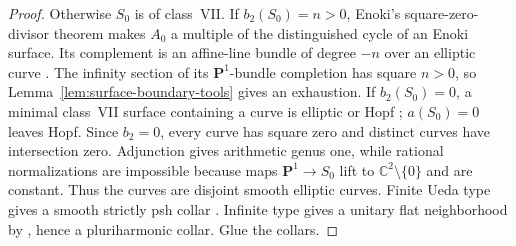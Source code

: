 \documentclass[11pt]{amsart}
\theoremstyle{definition}
\theoremstyle{remark}
\numberwithin{equation}{section}
\newcommand{\C}{\mathbb C}
\newcommand{\PP}{\mathbf P}
\begin{document}
\begin{proof}
Otherwise $S_0$ is of class~VII. If $b_2(S_0)=n>0$, Enoki's
square-zero-divisor theorem \cite[Main Theorem, p.~454]{Enoki}
makes $A_0$ a multiple of the distinguished cycle of an Enoki surface.
Its complement is an affine-line bundle of degree $-n$ over an
elliptic curve \cite[(0.4), p.~453]{Enoki}. The infinity section of
its $\PP^1$-bundle completion has square $n>0$, so
Lemma~\ref{lem:surface-boundary-tools} gives an exhaustion.
If $b_2(S_0)=0$, a minimal class~VII surface containing a curve is
elliptic or Hopf \cite[p.~453]{Enoki}; $a(S_0)=0$ leaves Hopf.
Since $b_2=0$, every curve has square zero and distinct curves have
intersection zero. Adjunction gives arithmetic genus one, while
rational normalizations are impossible because maps
$\PP^1\to S_0$ lift to $\C^2\setminus\{0\}$ and are constant.
Thus the curves are disjoint smooth elliptic curves.
Finite Ueda type gives a smooth strictly psh collar
\cite[Theorem~2.5]{CLPT2018}. Infinite type gives a unitary flat
neighborhood by \cite[Theorem~1.6]{CFSTZ2026}, hence a
pluriharmonic collar. Glue the collars.
\end{proof}
\end{document}
